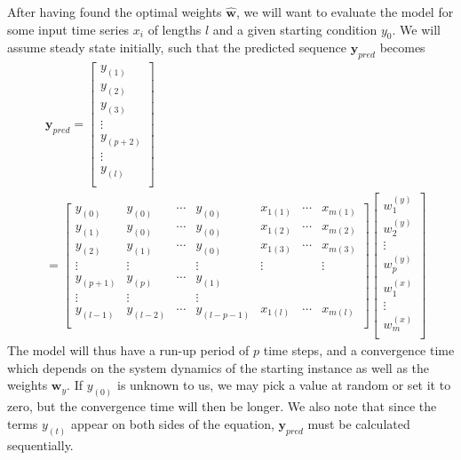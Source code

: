 \documentclass[]{article}
\begin{document}
After having found the optimal weights $\hat{\mathbf{w}}$, we will want to evaluate the model for some input time series $x_i$ of lengths $l$ and a given starting condition $y_0$. We will assume steady state initially, such that the predicted sequence $\mathbf{y}_{pred}$ becomes
\begin{equation}
\begin{aligned}
	&\mathbf{y}_{pred} = 
	\left[ 
\begin{array}{c}
	y_{(1)}	\\
	y_{(2)}	\\
	y_{(3)}	\\
	\vdots  \\
	y_{(p+2)}	\\
	\vdots  \\
	y_{(l)}	\\
\end{array}
\right]
	 \\
	&= \left[ 
		\begin{array}{ccccccc}
			y_{(0)} & y_{(0)} & \cdots & y_{(0)} & x_{1(1)} & \cdots &  x_{m(1)} \\
			y_{(1)} & y_{(0)} & \cdots & y_{(0)} & x_{1(2)} & \cdots &  x_{m(2)} \\	
			y_{(2)} & y_{(1)} & \cdots & y_{(0)} & x_{1(3)} & \cdots &  x_{m(3)} \\
			\vdots  & \vdots  &        & \vdots  & \vdots   &        &  \vdots   \\
			y_{(p+1)} & y_{(p)} & \cdots & y_{(1)}  \\
			\vdots  & \vdots  &        & \vdots     \\
			y_{(l-1)} & y_{(l-2)} & \cdots & y_{(l-p-1)} & x_{1(l)} & \cdots &  x_{m(l)} \\			
		\end{array}
	\right]
	\left[ 
\begin{array}{c}
w^{(y)}_1 \\
w^{(y)}_2 \\
\vdots \\
w^{(y)}_p \\
w^{(x)}_1 \\
\vdots \\
w^{(x)}_m \\
\end{array}
\right]	
\end{aligned}
\end{equation}
The model will thus have a run-up period of $p$ time steps, and a convergence time which depends on the system dynamics of the starting instance as well as the weights $\mathbf{w}_y$. If $y_{(0)}$ is unknown to us, we may pick a value at random or set it to zero, but the convergence time will then be longer. We also note that since the terms $y_{(t)}$ appear on both sides of the equation, $\mathbf{y}_{pred}$ must be calculated sequentially. 
\end{document}
